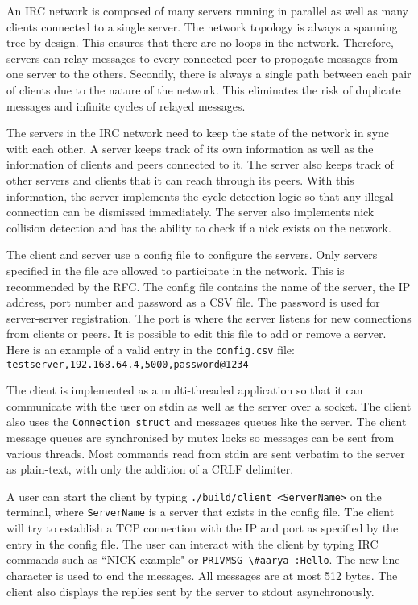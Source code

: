\documentclass[letterpaper,twocolumn,10pt]{article}
\begin{document}
An IRC network is composed of many servers running in parallel as well as many
clients connected to a single server. The network topology is always a spanning
tree by design. This ensures that there are no loops in the network. Therefore,
servers can relay messages to every connected peer to propogate messages from
one server to the others. Secondly, there is always a single path between each
pair of clients due to the nature of the network. This eliminates the risk of
duplicate messages and infinite cycles of relayed messages.

The servers in the IRC network need to keep the state of the network in sync with each
other. A server keeps track of its own information as well as the information
of clients and peers connected to it. The server also keeps track of other
servers and clients that it can reach through its peers. With this
information, the server implements the cycle detection logic so that any
illegal connection can be dismissed immediately. The server also implements
nick collision detection and has the ability to check if a nick exists on
the network.

The client and server use a config file to configure the servers. Only servers
specified in the file are allowed to participate in the network. This is
recommended by the RFC. The config file contains the name of the server, the IP
address, port number and password as a CSV file. The password is used for
server-server registration. The port is where the server listens for new
connections from clients or peers. It is possible to edit this file to add or
remove a server. Here is an example of a valid entry in the \verb|config.csv| file:
\verb|testserver,192.168.64.4,5000,password@1234|

The client is implemented as a multi-threaded application so that it can
communicate with the user on stdin as well as the server over a socket. The
client also uses the \verb|Connection struct| and messages queues like the
server. The client message queues are synchronised by mutex locks so messages
can be sent from various threads. Most commands read from stdin are sent
verbatim to the server as plain-text, with only the addition of a CRLF
delimiter.

A user can start the client by typing \verb|./build/client <ServerName>| on the
terminal, where \verb|ServerName| is a server that exists in the config file.
The client will try to establish a TCP connection with the IP and port
as specified by the entry in the config file. The user can interact with
the client by typing IRC commands such as ``NICK example" or \verb|PRIVMSG \#aarya :Hello|.
The new line character is used to end the messages. All messages are at most 512 bytes.
The client also displays the replies sent by the server to stdout asynchronously.
\end{document}
